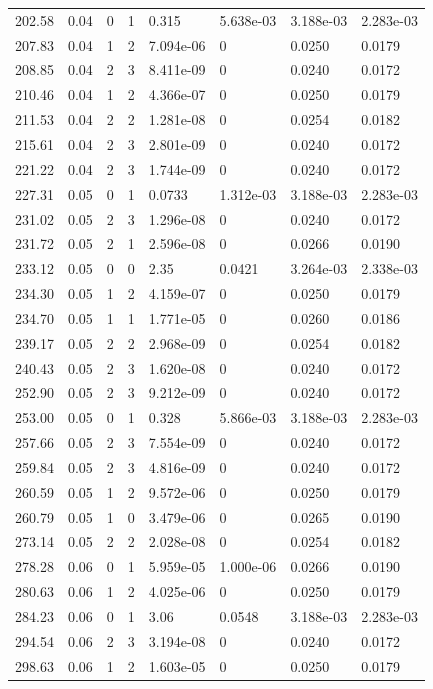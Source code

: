 \documentclass[preview]{standalone}
\begin{document}
{{{\begin{tabular}{L{1.2cm}C{1.2cm} C{0.3cm}C{0.5cm} C{1.4cm}C{1.4cm} C{1.4cm}C{1.4cm}}
  202.58  &  0.04  & 0     &  1 &  0.315  & 5.638e-03  & 3.188e-03 &  2.283e-03   \\ 
  207.83  &  0.04  & 1     &  2 &  7.094e-06  & 0  & 0.0250 &  0.0179   \\ 
  208.85  &  0.04  & 2     &  3 &  8.411e-09  & 0  & 0.0240 &  0.0172   \\ 
  210.46  &  0.04  & 1     &  2 &  4.366e-07  & 0  & 0.0250 &  0.0179   \\ 
  211.53  &  0.04  & 2     &  2 &  1.281e-08  & 0  & 0.0254 &  0.0182   \\ 
  215.61  &  0.04  & 2     &  3 &  2.801e-09  & 0  & 0.0240 &  0.0172   \\ 
  221.22  &  0.04  & 2     &  3 &  1.744e-09  & 0  & 0.0240 &  0.0172   \\ 
  227.31  &  0.05  & 0     &  1 &  0.0733  & 1.312e-03  & 3.188e-03 &  2.283e-03   \\ 
  231.02  &  0.05  & 2     &  3 &  1.296e-08  & 0  & 0.0240 &  0.0172   \\ 
  231.72  &  0.05  & 2     &  1 &  2.596e-08  & 0  & 0.0266 &  0.0190   \\ 
  233.12  &  0.05  & 0     &  0 &  2.35  & 0.0421  & 3.264e-03 &  2.338e-03   \\ 
  234.30  &  0.05  & 1     &  2 &  4.159e-07  & 0  & 0.0250 &  0.0179   \\ 
  234.70  &  0.05  & 1     &  1 &  1.771e-05  & 0  & 0.0260 &  0.0186   \\ 
  239.17  &  0.05  & 2     &  2 &  2.968e-09  & 0  & 0.0254 &  0.0182   \\ 
  240.43  &  0.05  & 2     &  3 &  1.620e-08  & 0  & 0.0240 &  0.0172   \\ 
  252.90  &  0.05  & 2     &  3 &  9.212e-09  & 0  & 0.0240 &  0.0172   \\ 
  253.00  &  0.05  & 0     &  1 &  0.328  & 5.866e-03  & 3.188e-03 &  2.283e-03   \\ 
  257.66  &  0.05  & 2     &  3 &  7.554e-09  & 0  & 0.0240 &  0.0172   \\ 
  259.84  &  0.05  & 2     &  3 &  4.816e-09  & 0  & 0.0240 &  0.0172   \\ 
  260.59  &  0.05  & 1     &  2 &  9.572e-06  & 0  & 0.0250 &  0.0179   \\ 
  260.79  &  0.05  & 1     &  0 &  3.479e-06  & 0  & 0.0265 &  0.0190   \\ 
  273.14  &  0.05  & 2     &  2 &  2.028e-08  & 0  & 0.0254 &  0.0182   \\ 
  278.28  &  0.06  & 0     &  1 &  5.959e-05  & 1.000e-06  & 0.0266 &  0.0190   \\ 
  280.63  &  0.06  & 1     &  2 &  4.025e-06  & 0  & 0.0250 &  0.0179   \\ 
  284.23  &  0.06  & 0     &  1 &  3.06  & 0.0548  & 3.188e-03 &  2.283e-03   \\ 
  294.54  &  0.06  & 2     &  3 &  3.194e-08  & 0  & 0.0240 &  0.0172   \\ 
  298.63  &  0.06  & 1     &  2 &  1.603e-05  & 0  & 0.0250 &  0.0179   \\ 
\hline 
\end{tabular} 

}}}
\end{document}
